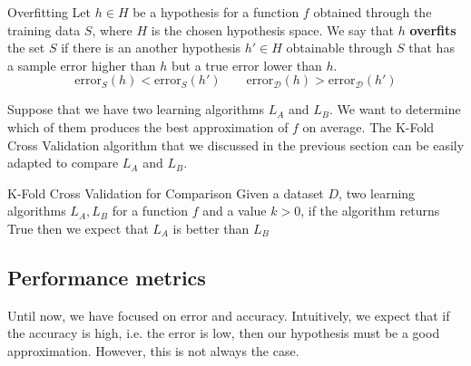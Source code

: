 \documentclass[a4paper, 12pt]{report}
\begin{document}
    \begin{frameddefn}{Overfitting}
        Let $h \in H$ be a hypothesis for a function $f$ obtained through the training data $S$, where $H$ is the chosen hypothesis space. We say that $h$ \textbf{overfits} the set $S$ if there is an another hypothesis $h' \in H$ obtainable through $S$ that has a sample error higher than $h$ but a true error lower than $h$. 
        \[\mathrm{error}_S(h) < \mathrm{error}_S(h') \qquad \mathrm{error}_\mathcal{D}(h) > \mathrm{error}_\mathcal{D}(h')\]
    \end{frameddefn}

    Suppose that we have two learning algorithms $L_A$ and $L_B$. We want to determine which of them produces the best approximation of $f$ on average. The K-Fold Cross Validation algorithm that we discussed in the previous section can be easily adapted to compare $L_A$ and $L_B$.

    \begin{framedalgo}{K-Fold Cross Validation for Comparison}
        Given a dataset $D$, two learning algorithms $L_A, L_B$ for a function $f$ and a value $k > 0$, if the algorithm returns True then we expect that $L_A$ is better than $L_B$
        \begin{algorithmic}
                \EndFor
            \EndFunction
        \end{algorithmic}
    \end{framedalgo}

    \subsection{Performance metrics}

    Until now, we have focused on error and accuracy. Intuitively, we expect that if the accuracy is high, i.e. the error is low, then our hypothesis must be a good approximation. However, this is not always the case.
\end{document}

